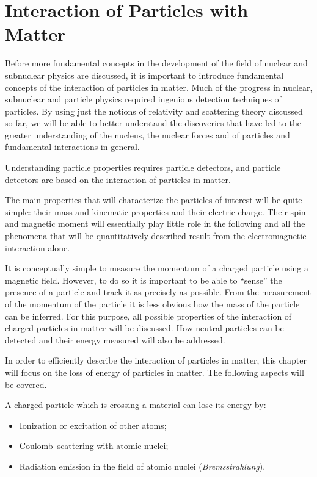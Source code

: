 %
%
%
\chapter{Interaction of Particles with Matter}
\label{chap:InteractionsInMatter}

Before more fundamental concepts in the development of the field of nuclear and subnuclear physics are discussed, it is important to introduce fundamental concepts of the interaction of particles in matter. Much of the progress in nuclear, subnuclear and particle physics required ingenious detection techniques of particles. By using just the notions of relativity and scattering theory discussed so far, we will be able to better understand the discoveries that have led to the greater understanding of the nucleus, the nuclear forces and of particles and fundamental interactions in general. 

Understanding particle properties requires particle detectors, and particle detectors are based on the interaction of particles in matter. 

The main properties that will characterize the particles of interest will be quite simple: their mass and kinematic properties and their electric charge. Their spin and magnetic moment will essentially play little role in the following and all the phenomena that will be quantitatively described result from the electromagnetic interaction alone.

It is conceptually simple to measure the momentum of a charged particle using a magnetic field. However, to do so it is important to be able to ``sense'' the presence of a particle and track it as precisely as possible. From the measurement of the momentum of the particle it is less obvious how the mass of the particle can be inferred. For this purpose, all possible properties of the interaction of charged particles in matter will be discussed. How neutral particles can be detected and their energy measured will also be addressed. 

In order to efficiently describe the interaction of particles in matter, this chapter will focus on the loss of energy of particles in matter. The following aspects will be covered.

A charged particle which is crossing a material can lose its energy by:
\begin{itemize}
\item Ionization or excitation of other atoms;
\item Coulomb--scattering with atomic nuclei;
\item Radiation emission in the field of atomic nuclei (\emph{Bremsstrahlung}).
\end{itemize}

